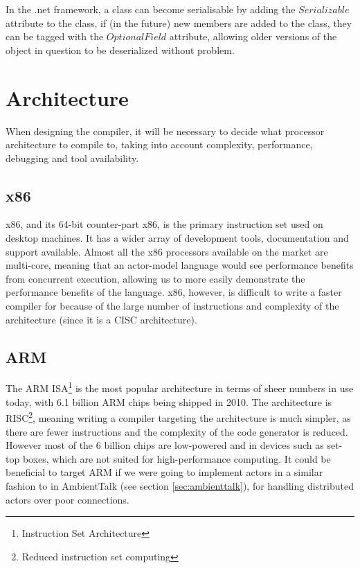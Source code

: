 \documentclass[pdftex,11pt,a4paper]{report}
\begin{document}
In the .net framework, a class can become serialisable by adding the $Serializable$\cite{net-serializable} attribute to the class, if (in the future) new members are added to the class, they can be tagged with the $OptionalField$ attribute\cite{net-optional}, allowing older versions of the object in question to be deserialized without problem.

\newpage
\newpage
\section{Architecture}

When designing the compiler, it will be necessary to decide what processor architecture to compile to, taking into account complexity, performance, debugging and tool availability.

\subsection{x86}

x86, and its 64-bit counter-part x86, is the primary instruction set used on desktop machines. It has a wider array of development tools, documentation and support available.
Almost all the x86 processors available on the market are multi-core, meaning that an actor-model language would see performance benefits from concurrent execution, allowing us to more easily demonstrate the performance benefits of the language.
x86, however, is difficult to write a faster compiler for because of the large number of instructions and complexity of the architecture (since it is a CISC architecture).

\subsection{ARM}

The ARM ISA\footnote{Instruction Set Architecture} is the most popular architecture in terms of sheer numbers in use today, with 6.1 billion ARM chips being shipped in 2010\cite{theregister2011}.
The architecture is RISC\footnote{Reduced instruction set computing}, meaning writing a compiler targeting the architecture is much simpler, as there are fewer instructions and the complexity of the code generator is reduced.
However most of the 6 billion chips are low-powered and in devices such as set-top boxes, which are not suited for high-performance computing. It could be beneficial to target ARM if we were going to implement actors in a similar fashion to in AmbientTalk (see section \ref{sec:ambienttalk}), for handling distributed actors over poor connections.
\end{document}
